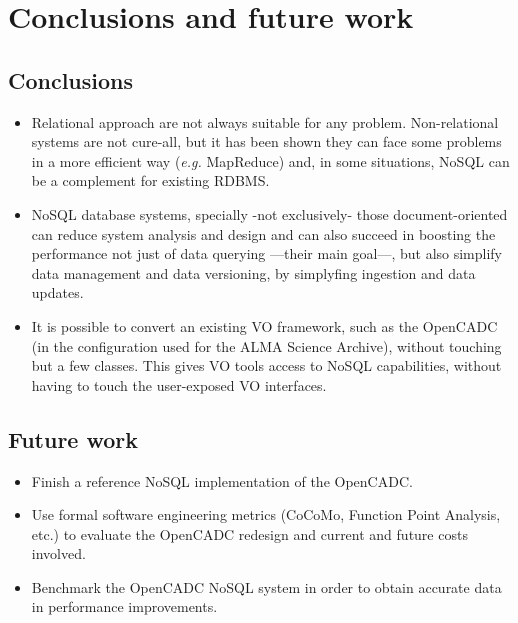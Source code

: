 \chapter{Conclusions and future work} %
\label{cha:conclusions_and_future_work}

\section{Conclusions} %
\label{sec:conclusions}

\begin{itemize}

\item Relational approach are not always suitable for any problem. Non-relational systems are not cure-all, but it has been shown they can face some problems in a more efficient way (\textit{e.g.} MapReduce) and, in some situations, NoSQL can be a complement for existing RDBMS.

\item NoSQL database systems, specially -not exclusively- those document-oriented can reduce system analysis and design and can also succeed in boosting the performance not just of data querying ---their main goal---, but also simplify data management and data versioning, by simplyfing ingestion and data updates.

\item It is possible to convert an existing VO framework, such as the OpenCADC (in the configuration used for the ALMA Science Archive), without touching but a few classes. This gives VO tools access to NoSQL capabilities, without having to touch the user-exposed VO interfaces.

\end{itemize}


\section{Future work} %
\label{sec:future_work}

\begin{itemize}


\item Finish a reference NoSQL implementation of the OpenCADC.

\item %
Use %
formal
software engineering
metrics
(CoCoMo, Function Point Analysis, etc.) to
evaluate %
the
OpenCADC
redesign
and current and future costs involved.

\item Benchmark the OpenCADC NoSQL system
in order to obtain accurate data in performance improvements.

\end{itemize}



